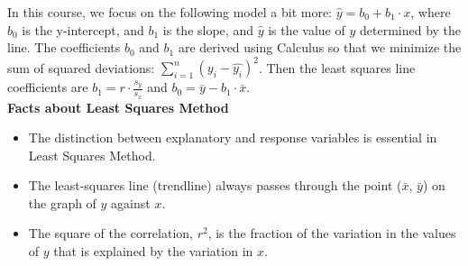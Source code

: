 In this course, we focus on the following model a bit more: $\hat{y} = b_0 + b_1\cdot x$, where $b_0$ is the y-intercept, and $b_1$ is the slope, and $\hat{y}$ is the value of $y$ determined by the line. The coefficients $b_0$ and $b_1$ are derived using Calculus so that we minimize the sum of squared deviations: $\sum_{i=1}^{n}(y_i - \hat{y_i})^2$. Then the least squares line coefficients are $b_1 = r \cdot \frac{s_y}{s_x}$ and $b_0 = \bar{y} - b_1\cdot \bar{x}$.\\

\textbf{Facts about Least Squares Method}

\begin{itemize}
	\item The distinction between explanatory and response variables is essential in Least Squares Method.
	\item The least-squares line (trendline) always passes through the point ($\bar{x}$, $\bar{y}$) on the graph of $y$ against $x$.
	\item The square of the correlation, $r^2$, is the fraction of the variation in the values of $y$ that is explained by the variation in $x$.
\end{itemize}


